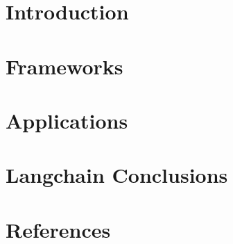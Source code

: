 \section[Intro]{Introduction}


\section[Frameworks]{Frameworks}


\section[Apps]{Applications}


\section[Concl]{Langchain Conclusions}


\section[Refs]{References}


